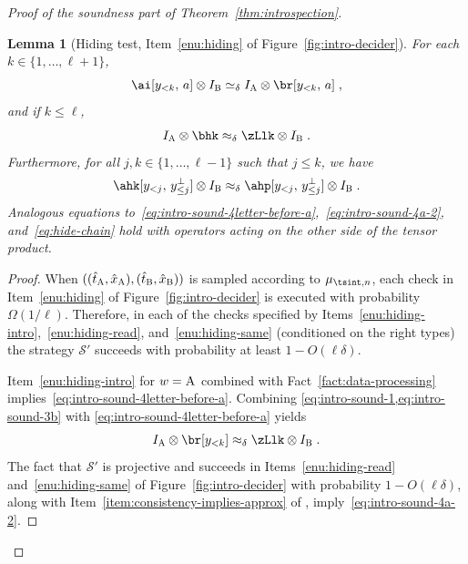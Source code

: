 \documentclass[11pt]{article}
\newtheorem{lemma}[theorem]{Lemma}
\theoremstyle{definition}
\newcommand{\Id}{\ensuremath{I}}
\newcommand{\ia}{\Id_\alice}
\newcommand{\ib}{\Id_\bob}
\newcommand{\strategy}{\mathscr{S}}
\newcommand{\labelstyle}[1]{\ensuremath{\textsc{#1}}\xspace}
\newcommand{\alice}{\labelstyle{A}}
\newcommand{\bob}{\labelstyle{B}}
\newcommand{\abc}[1][\delta]{\otimes I_\bob \simeq_{#1} I_\alice \otimes}
\begin{document}
\begin{proof}[Proof of the soundness part of Theorem~\ref{thm:introspection}]
  \begin{lemma}[Hiding test, Item~\ref{enu:hiding} of
    Figure~\ref{fig:intro-decider}]\label{lem:intro-sound-2}
    For each $k \in \{1, \ldots, \ell+1\}$,
    \begin{equation}\label{eq:intro-sound-4letter-before-a}
      \ai[y_{< k},\, a] \abc \br[y_{< k},\, a]\;,
    \end{equation}
    and if $k\leq \ell$,
    \begin{equation}\label{eq:intro-sound-4a-2}
      \ia \otimes \bhk  \approx_\delta \zLlk \otimes \ib\;.
    \end{equation}
    Furthermore, for all $j,k \in \{1,\ldots,\ell -1 \}$ such that $j \leq k$,
    we have
    \begin{equation}
      \label{eq:hide-chain}
      \ahk[y_{<j},\, y_{\leq j}^\perp] \otimes \ib \approx_\delta
      \ahp[y_{<j},\, y_{\leq j}^\perp] \otimes \ib\;.
    \end{equation}
    Analogous equations
    to~\eqref{eq:intro-sound-4letter-before-a},~\eqref{eq:intro-sound-4a-2},
    and~\eqref{eq:hide-chain} hold with operators acting on the other side of
    the tensor product.
  \end{lemma}
	
  \begin{proof}
    When $((\hat{t}_\alice,\hat{x}_\alice),(\hat{t}_\bob,\hat{x}_\bob))$ is
    sampled according to $\mu_{\tsint,n}$, each check in
    Item~\ref{enu:hiding} of Figure~\ref{fig:intro-decider} is executed with
    probability $\Omega(1/\ell)$.
    Therefore, in each of the checks specified by
    Items~\ref{enu:hiding-intro},~\ref{enu:hiding-read}, and~\ref{enu:hiding-same}
    (conditioned on the right types) the strategy
    $\strategy'$ succeeds with probability at least $1 - O(\ell \delta)$.

    Item~\ref{enu:hiding-intro} for $w=\alice$ combined with
    Fact~\ref{fact:data-processing}
    implies~\eqref{eq:intro-sound-4letter-before-a}.
    Combining \cref{eq:intro-sound-1,eq:intro-sound-3b} with
    \eqref{eq:intro-sound-4letter-before-a} yields
    \begin{equation}
      \label{eq:intro-sound-4a}
      \ia \otimes \br[y_{< k}] \approx_\delta \zLlk \otimes \ib\;.
    \end{equation}
    The fact that $\strategy'$ is projective and succeeds in
    Items~\ref{enu:hiding-read} and~\ref{enu:hiding-same} of
    Figure~\ref{fig:intro-decider} with probability $1 - O(\ell \delta)$,
    along with Item~\ref{item:consistency-implies-approx} of
    , imply~\eqref{eq:intro-sound-4a-2}.
  

\end{proof}
\end{proof}
\end{document}
